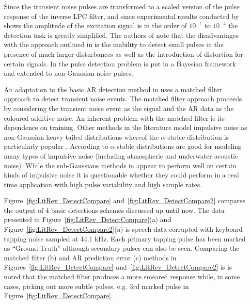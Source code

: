 Since the transient noise pulses are transformed to a scaled version of the pulse response of the inverse LPC filter, and since experimental results conducted by \cite{Vaseghi1990} shows the amplitude of the excitation signal is in the order of $10^{-1}$ to $10^{-4}$ the detection task is greatly simplified. The authors of \cite{Godsill1998} note that the disadvantages with the approach outlined in \cite{Vaseghi1990} is the inability to detect small pulses in the presence of much larger disturbances as well as the introduction of distortion for certain signals. In \cite{Godsill1998} the pulse detection problem is put in a Bayesian framework and extended to non-Gaussian noise pulses.

An adaptation to the basic AR detection method in \cite{Vaseghi1988} uses a matched filter approach to detect transient noise events. The matched filter approach proceeds by considering the transient noise event as the signal and the AR data as the coloured additive noise. 
An inherent problem with the matched filter is its dependence on training. Other methods in the literature model impulsive noise as non-Gaussian heavy-tailed distributions whereof the $\alpha$-stable distribution is particularly popular \cite{Tsihrintzis1997}\cite{Coates2002}. According to \cite{Nikias1995} $\alpha$-stable distributions are good for modeling many types of impulsive noise (including atmospheric and underwater acoustic noise). While the sub-Gaussians methods in \cite{Tsihrintzis1997}\cite{Coates2002} appear to perform well on certain kinds of impulsive noise it is questionable whether they could perform in a real time application with high pulse variability and high sample rates.

Figure~\ref{fig:LitRev_DetectCompare} and~\ref{fig:LitRev_DetectCompare2} compares the output of 4 basic detections schemes discussed up until now. The data presented in Figure~\ref{fig:LitRev_DetectCompare}(a) and Figure~\ref{fig:LitRev_DetectCompare2}(a) is speech data corrupted with keyboard tapping noise sampled at 44.1 kHz. Each primary tapping pulse has been marked as ``Ground Truth'' although secondary pulses can also be seen. Comparing the matched filter (b) and AR prediction error (c) methods in Figures~\ref{fig:LitRev_DetectCompare} and~\ref{fig:LitRev_DetectCompare2} is is noted that the matched filter produces a more smeared response while, in some cases, picking out more subtle pulses\cite{Godsill1998book}, e.g. 3rd marked pulse in Figure~\ref{fig:LitRev_DetectCompare}.


